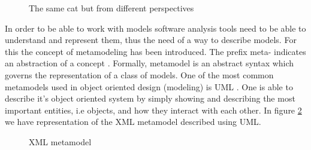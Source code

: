 \begin{figure}
\centering
{}
\caption{The same cat but from different perspectives\label{fig:CatModel}}
\end{figure}	
	
	In order to be able to work with models software analysis tools need to be able
to understand and represent them, thus the need of a way to describe models. For
this the concept of metamodeling has been introduced. The prefix meta- indicates 
an abstraction of a concept \cite{wiki:meta}. Formally, metamodel is an abstract 
syntax which governs the representation of a class of models. One of the most
common metamodels used in object oriented design (modeling) is UML
\cite{book:UMLDistilled}. One is able to describe it's object oriented system by
simply showing and describing the most important entities, i.e objects, and how
they interact with each other. In  figure \ref{fig:umlMetamodel} we have
representation of the XML metamodel described using UML.

   \begin{figure}
		\centering
		\caption{XML metamodel\label{fig:umlMetamodel}}
	\end{figure}

